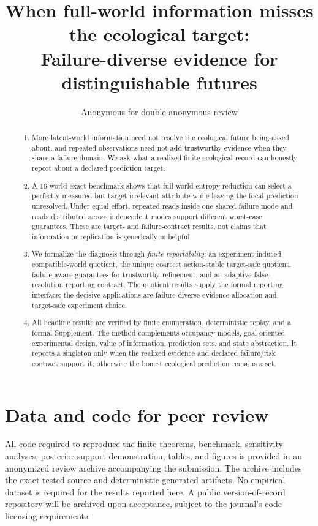 \documentclass[11pt]{article}
\title{When full-world information misses the ecological target:\\Failure-diverse evidence for distinguishable futures}
\author{Anonymous for double-anonymous review}
\date{}
\begin{document}
\maketitle

\begin{abstract}
\begin{enumerate}
\item More latent-world information need not resolve the ecological future being asked about, and repeated observations need not add trustworthy evidence when they share a failure domain. We ask what a realized finite ecological record can honestly report about a declared prediction target.
\item A 16-world exact benchmark shows that full-world entropy reduction can select a perfectly measured but target-irrelevant attribute while leaving the focal prediction unresolved. Under equal effort, repeated reads inside one shared failure mode and reads distributed across independent modes support different worst-case guarantees. These are target- and failure-contract results, not claims that information or replication is generically unhelpful.
\item We formalize the diagnosis through \emph{finite reportability}: an experiment-induced compatible-world quotient, the unique coarsest action-stable target-safe quotient, failure-aware guarantees for trustworthy refinement, and an adaptive false-resolution reporting contract. The quotient results supply the formal reporting interface; the decisive applications are failure-diverse evidence allocation and target-safe experiment choice.
\item All headline results are verified by finite enumeration, deterministic replay, and a formal Supplement. The method complements occupancy models, goal-oriented experimental design, value of information, prediction sets, and state abstraction. It reports a singleton only when the realized evidence and declared failure/risk contract support it; otherwise the honest ecological prediction remains a set.
\end{enumerate}
\end{abstract}

\section*{Data and code for peer review}
All code required to reproduce the finite theorems, benchmark, sensitivity analyses, posterior-support demonstration, tables, and figures is provided in an anonymized review archive accompanying the submission. The archive includes the exact tested source and deterministic generated artifacts. No empirical dataset is required for the results reported here. A public version-of-record repository will be archived upon acceptance, subject to the journal's code-licensing requirements.
\end{document}
